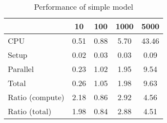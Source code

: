 \begin{table}[!h]
\centering
\caption{Performance of simple model}
\begin{tabular}{l*{4}{c}}\hline
& 10 &             100 &            1000 &            5000 \\ \hline
CPU &     0.51 &      0.88 &      5.70 &     43.46 \\
Setup &     0.02 &      0.03 &      0.03 &      0.09 \\
Parallel &     0.23 &      1.02 &      1.95 &      9.54 \\
Total &     0.26 &      1.05 &      1.98 &      9.63 \\
Ratio (compute) &     2.18 &      0.86 &      2.92 &      4.56 \\
Ratio (total) &     1.98 &      0.84 &      2.88 &      4.51 \\
\hline
\end{tabular}
\end{table}
